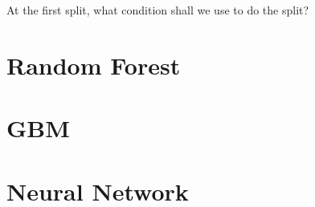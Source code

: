 \documentclass[notheorems, aspectratio=54]{beamer}
\begin{document}
\begin{frame}
\begin{center}
At the first split, what condition shall we use to do the split?
\end{center}

\end{frame}


\section{Random Forest}

\section{GBM}


\section{Neural Network}
\begin{frame}
\end{frame}
\end{document}
